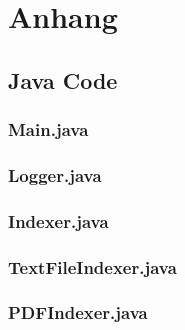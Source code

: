 
\newpage
\chapter{Anhang}
\label{sec:Anhang} 
\section{Java Code}
\label{sec:JavaCode}
\subsection{Main.java}
\label{subsec:Main.java}
\lstset{language=java, mathescape=true}

\subsection{Logger.java}
\label{subsec:Logger.java}
\lstset{language=java, mathescape=true}

\newpage
\subsection{Indexer.java}
\label{subsec:Indexer.java}
\lstset{language=java, mathescape=true}

\newpage
\subsection{TextFileIndexer.java}
\label{subsec:TextFileIndexer.java}
\lstset{language=java, mathescape=true}

\newpage
\subsection{PDFIndexer.java}
\label{subsec:PDFIndexer.java}
\lstset{language=java, mathescape=true}

\newpage
